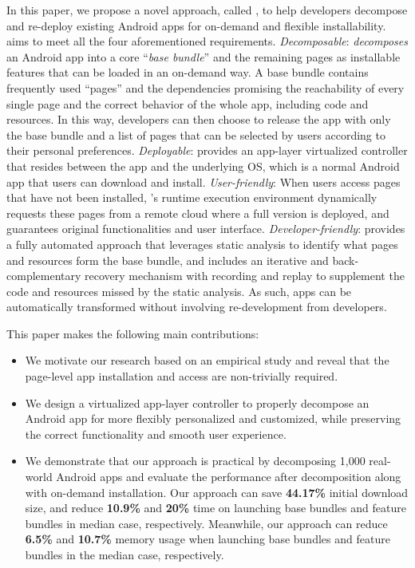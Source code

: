 In this paper, we propose a novel approach, called \nickName{}, to help developers decompose and re-deploy existing Android apps for on-demand and flexible installability. 
\nickName{}  aims to meet all the four aforementioned requirements. 
\emph{Decomposable}: \nickName \emph{decomposes} an Android app into a core ``\emph{base bundle}'' and the remaining pages as installable features that can be loaded in an on-demand way. A base bundle contains frequently used ``pages'' and the dependencies promising the reachability of every single page and the correct behavior of the whole app, including code and resources. In this way, developers can then choose to release the app with only the base bundle and a list of pages that can be selected by users according to their personal preferences. 
\emph{Deployable}: \nickName{} provides an app-layer virtualized controller that resides between the app and the underlying OS, which is a normal Android app that users can download and install. 
\emph{User-friendly}: When users access pages that have not been installed, \nickName{}'s runtime execution environment dynamically requests these pages from a remote cloud where a full version is deployed, and guarantees original functionalities and user interface.
\emph{Developer-friendly}: \nickName provides a fully automated approach that leverages static analysis to identify what pages and resources form the base bundle, and includes an iterative and back-complementary recovery mechanism with recording and replay to supplement the code and resources missed by the static analysis. 
As such, apps can be automatically transformed without involving re-development from developers.

This paper makes the following main contributions:

\begin{itemize}
	\item We motivate our research based on an empirical study and reveal that the page-level app installation and access are non-trivially  required.
	\item We design a virtualized app-layer controller to properly decompose an Android app for more flexibly personalized and customized, while  preserving the correct functionality and smooth user experience.
	\item We demonstrate that our approach is practical by decomposing 1,000 real-world Android apps and evaluate the performance after decomposition along with on-demand installation. Our approach can save \textbf{44.17\%} initial download size, and reduce \textbf{10.9\%} and \textbf{20\%} time on launching base bundles and feature bundles in median case, respectively. Meanwhile, our approach can reduce \textbf{6.5\%} and \textbf{10.7\%} memory usage when launching base bundles and feature bundles in the median case, respectively.
\end{itemize}
